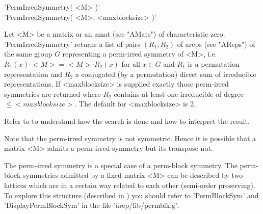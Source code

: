 
'PermIrredSymmetry( <M> )'\\
'PermIrredSymmetry( <M>, <maxblocksize> )'

Let <M> be a matrix or an amat (see "AMats") of characteristic zero. 
'PermIrredSymmetry' returns a list of pairs $(R_1, R_2)$ of 
areps (see "AReps") of the same group $G$
representing a perm-irred symmetry of <M>, i.e.
$R_1(x)\cdot <M> = <M>\cdot R_2(x)$ for all $x\in G$ and
$R_1$ is a permutation representation and $R_2$ a 
conjugated (by a permutation) direct sum of irreducible
representations.
If <maxblocksize> is supplied exactly those perm-irred symmetries 
are returned where $R_2$ contains at least one irreducible of degree 
$\leq <maxblocksize>$. The default for <maxblocksize> is 2. 

Refer to \cite{Egn97} to understand how the search is done and 
how to interpret the result.

Note that the perm-irred symmetry is not symmetric. Hence it is 
possible that a matrix <M> admits a perm-irred symmetry but its
transpose not.

The perm-irred symmetry is a special case of a perm-block symmetry.
The perm-block symmetries admitted by a fixed matrix <M> can be
described by two lattices which are in a certain way related to 
each other (semi-order preserving). To explore this structure 
(described in \cite{Egn97}) you should refer to 'PermBlockSym' 
and 'DisplayPermBlockSym' in the file '\"arep/lib/permblk.g\"'.

